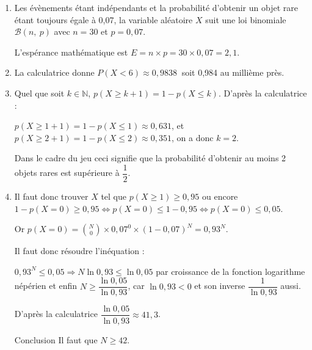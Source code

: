 \documentclass[10pt]{article}
\providecommand{\N}{\mathbb{N}}
\providecommand{\np}[2][]{{#2~#1}}
\begin{document}
\begin{enumerate}
\item 
Les évènements étant indépendants et la probabilité d'obtenir un objet rare étant toujours égale à 0,07, la variable aléatoire $X$ suit une loi binomiale $\mathcal{B}(n,\:p)$ avec $n = 30$ et $p = 0,07$.

L'espérance mathématique est $E = n \times p = 30 \times 0,07 = 2,1$.
\item 

La calculatrice donne $P(X < 6) \approx \np{0,9838}$ soit 0,984 au millième près.
\item 
Quel que soit $k \in \N$, \: $p(X \geqslant k + 1) = 1 - p(X \leqslant k)$.
D'après la calculatrice :

$p(X \geqslant 1 + 1) = 1 - p(X \leqslant 1) \approx 0,631$, et $p(X \geqslant 2 + 1) = 1 - p(X \leqslant 2) \approx 0,351$, on a donc $k = 2$.

Dans le cadre du jeu ceci signifie que la probabilité d'obtenir au moins 2 objets rares est supérieure à $\dfrac12$.
\item 





Il faut donc trouver $X$ tel que $p(X \geqslant 1) \geqslant 0,95$ ou encore $1 - p(X = 0) \geqslant 0,95 \iff p(X = 0) \leqslant 1 - 0,95 \iff p(X = 0) \leqslant 0,05$.

Or $p(X = 0) = \binom{N}{0} \times 0,07^0 \times (1 - 0,07)^N = 0,93^N$.

Il faut donc résoudre l'inéquation :

$0,93^N \leqslant 0,05 \Rightarrow N \ln 0,93 \leqslant \ln 0,05$ par croissance de la fonction logarithme népérien  et enfin $N \geqslant \dfrac{\ln 0,05}{\ln 0,93}$, car $\ln 0,93 < 0$ et son inverse $\dfrac{1}{\ln 0,93}$ aussi.

D'après la calculatrice $\dfrac{\ln 0,05}{\ln 0,93} \approx 41,3$.

Conclusion Il faut que $N \geqslant 42$.
\end{enumerate}
\end{document}
